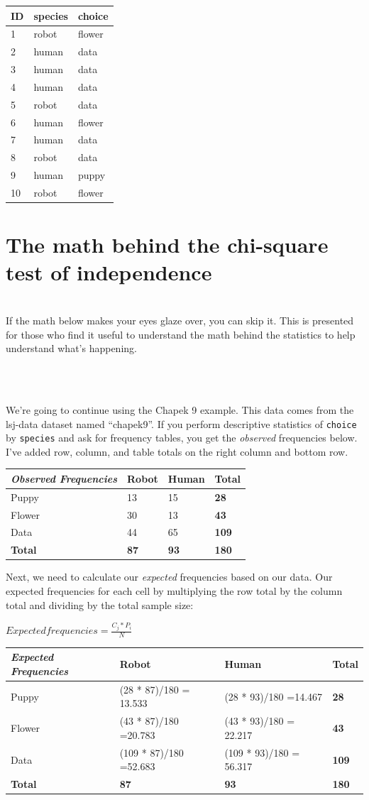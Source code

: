 \documentclass[
]{book}
\newenvironment{info}
    {
    \hline\\
    }
    { 
    \\\\\hline
    }
\begin{document}
\begin{longtable}[]{@{}lll@{}}
\toprule
ID & species & choice\tabularnewline
\midrule
\endhead
1 & robot & flower\tabularnewline
2 & human & data\tabularnewline
3 & human & data\tabularnewline
4 & human & data\tabularnewline
5 & robot & data\tabularnewline
6 & human & flower\tabularnewline
7 & human & data\tabularnewline
8 & robot & data\tabularnewline
9 & human & puppy\tabularnewline
10 & robot & flower\tabularnewline
\bottomrule
\end{longtable}

\hypertarget{the-math-behind-the-chi-square-test-of-independence}{%
\section{The math behind the chi-square test of independence}\label{the-math-behind-the-chi-square-test-of-independence}}

\begin{info}
If the math below makes your eyes glaze over, you can skip it. This is
presented for those who find it useful to understand the math behind the
statistics to help understand what's happening.
\end{info}

We're going to continue using the Chapek 9 example. This data comes from the lsj-data dataset named ``chapek9''. If you perform descriptive statistics of \texttt{choice} by \texttt{species} and ask for frequency tables, you get the \emph{observed} frequencies below. I've added row, column, and table totals on the right column and bottom row.

\begin{longtable}[]{@{}llll@{}}
\toprule
\emph{Observed Frequencies} & Robot & Human & Total\tabularnewline
\midrule
\endhead
Puppy & 13 & 15 & \textbf{28}\tabularnewline
Flower & 30 & 13 & \textbf{43}\tabularnewline
Data & 44 & 65 & \textbf{109}\tabularnewline
\textbf{Total} & \textbf{87} & \textbf{93} & \textbf{180}\tabularnewline
\bottomrule
\end{longtable}

Next, we need to calculate our \emph{expected} frequencies based on our data. Our expected frequencies for each cell by multiplying the row total by the column total and dividing by the total sample size:

\(Expected frequencies = \frac{C_j * P_i}{N}\)

\begin{longtable}[]{@{}llll@{}}
\toprule
\emph{Expected Frequencies} & Robot & Human & Total\tabularnewline
\midrule
\endhead
Puppy & (28 * 87)/180 = 13.533 & (28 * 93)/180 =14.467 & \textbf{28}\tabularnewline
Flower & (43 * 87)/180 =20.783 & (43 * 93)/180 = 22.217 & \textbf{43}\tabularnewline
Data & (109 * 87)/180 =52.683 & (109 * 93)/180 = 56.317 & \textbf{109}\tabularnewline
\textbf{Total} & \textbf{87} & \textbf{93} & \textbf{180}\tabularnewline
\bottomrule
\end{longtable}
\end{document}

